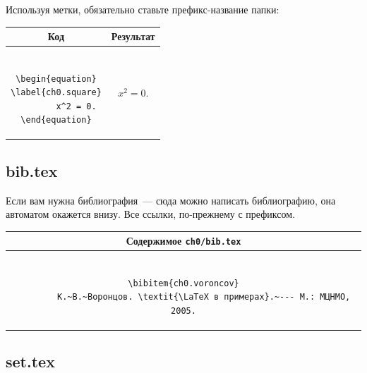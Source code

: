 Используя метки, обязательно ставьте префикс-название папки:
\begin{center}
\begin{tabular}{|c|c|}
\hline
        Код & Результат

\\ \hline        
        \begin{minipage}{3in}
                \begin{verbatim}

\begin{equation}
\label{ch0.square}
        x^2 = 0.
\end{equation}
                \end{verbatim}
        \end{minipage}
        &
        \begin{minipage}{3in}
                \begin{equation}\label{ch0.square}
                    x^2 = 0.
                \end{equation}
        \end{minipage}
\\ \hline
\end{tabular}
\end{center}


\subsection{bib.tex}

Если вам нужна библиография~--- сюда можно написать библиографию, она автоматом окажется внизу. Все ссылки, по-прежнему с префиксом.
\begin{center}
\begin{tabular}{|c|}
\hline
        Содержимое \texttt{ch0/bib.tex}

\\ \hline        
        \begin{minipage}{6in}
                \begin{verbatim}

\bibitem{ch0.voroncov}
        К.~В.~Воронцов. \textit{\LaTeX в примерах}.~--- М.: МЦНМО, 2005.
                \end{verbatim}
        \end{minipage}
\\ \hline
\end{tabular}
\end{center}


\subsection{set.tex}

